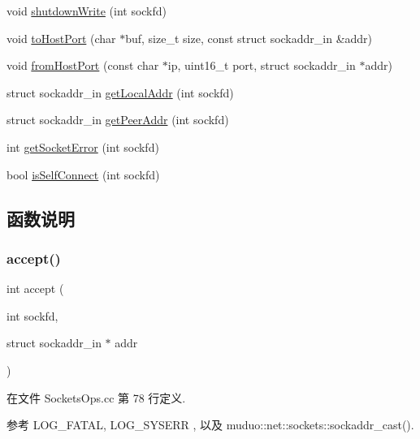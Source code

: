 \begin{DoxyCompactItemize}
\item 
void \hyperlink{namespacemuduo_1_1sockets_a549ec5e856fec6f111aeb481cca9e622}{shutdown\+Write} (int sockfd)
\item 
void \hyperlink{namespacemuduo_1_1sockets_adbdc909d04fd53860d9175b51755b0ae}{to\+Host\+Port} (char $\ast$buf, size\+\_\+t size, const struct sockaddr\+\_\+in \&addr)
\item 
void \hyperlink{namespacemuduo_1_1sockets_ae40b8bfde260835c9034bfaea0fb4ee0}{from\+Host\+Port} (const char $\ast$ip, uint16\+\_\+t port, struct sockaddr\+\_\+in $\ast$addr)
\item 
struct sockaddr\+\_\+in \hyperlink{namespacemuduo_1_1sockets_a4b4793e2d3f77da7bab38cfb52274075}{get\+Local\+Addr} (int sockfd)
\item 
struct sockaddr\+\_\+in \hyperlink{namespacemuduo_1_1sockets_ad095a2bf0c44507c945d04f8346f2817}{get\+Peer\+Addr} (int sockfd)
\item 
int \hyperlink{namespacemuduo_1_1sockets_a80bd626331e049209f59d11c80a8b539}{get\+Socket\+Error} (int sockfd)
\item 
bool \hyperlink{namespacemuduo_1_1sockets_ae3b7d08b5cb176e9d67580a0a1fd57fb}{is\+Self\+Connect} (int sockfd)
\end{DoxyCompactItemize}


\subsection{函数说明}
\mbox{\label{namespacemuduo_1_1sockets_a5fe7cd11cb2662939917285c51b3f992}} 
\subsubsection{\texorpdfstring{accept()}{accept()}}
{\footnotesize\ttfamily int accept (\begin{DoxyParamCaption}\item[{int}]{sockfd,  }\item[{struct sockaddr\+\_\+in $\ast$}]{addr }\end{DoxyParamCaption})}



在文件 Sockets\+Ops.\+cc 第 78 行定义.



参考 L\+O\+G\+\_\+\+F\+A\+T\+AL, L\+O\+G\+\_\+\+S\+Y\+S\+E\+RR , 以及 muduo\+::net\+::sockets\+::sockaddr\+\_\+cast().



